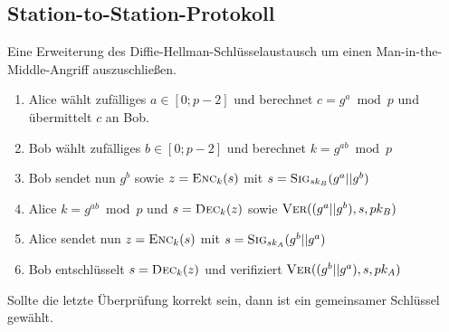 \documentclass[a4paper,landscape]{article}
\newcommand{\skey}{\ensuremath{sk}}
\newcommand{\pkey}{\ensuremath{pk}}
\newcommand{\enc}{\textsc{Enc}}
\newcommand{\dec}{\textsc{Dec}}
\newcommand{\sig}{\textsc{Sig}}
\newcommand{\ver}{\textsc{Ver}}
\begin{document}
\begin{multicols*}{4}
	\subsection{Station-to-Station-Protokoll}
	Eine Erweiterung des Diffie-Hellman-Schlüsselaustausch um einen
	Man-in-the-Middle-Angriff auszuschließen.
	\begin{enumerate}
		\item Alice wählt zufälliges $a \in [0;p-2]$ und berechnet $c = g^{a} \bmod p$
		      und übermittelt $c$ an Bob.
		\item Bob wählt zufälliges $b \in [0;p-2]$ und berechnet $k = g^{ab} \bmod p$
		\item Bob sendet nun $g^{b}$ sowie $z = \enc_{k}(s)$ mit $s = \sig_{\skey_{B}}(g^{a}||g^{b})$
		\item Alice $k = g^{ab} \bmod p$ und $s = \dec_{k}(z)$ sowie $\ver((g^{a}||g^{b}),s,\pkey_{B})$
		\item Alice sendet nun $z = \enc_{k}(s)$ mit $s = \sig_{\skey_{A}}(g^{b}||g^{a})$
		\item Bob entschlüsselt $s = \dec_{k}(z)$ und verifiziert $\ver((g^{b}||g^{a}),s,\pkey_{A})$
	\end{enumerate}
	Sollte die letzte Überprüfung korrekt sein, dann ist ein gemeinsamer Schlüssel gewählt.
	\columnbreak


\end{multicols*}
\end{document}
